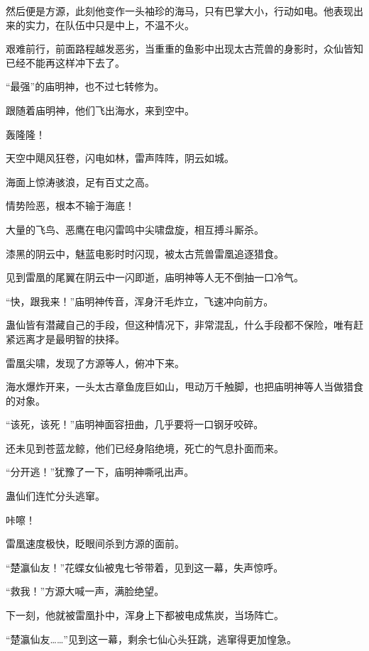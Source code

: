 \begin{this_body}
然后便是方源，此刻他变作一头袖珍的海马，只有巴掌大小，行动如电。他表现出来的实力，在队伍中只是中上，不温不火。

艰难前行，前面路程越发恶劣，当重重的鱼影中出现太古荒兽的身影时，众仙皆知已经不能再这样冲下去了。

“最强”的庙明神，也不过七转修为。

跟随着庙明神，他们飞出海水，来到空中。

轰隆隆！

天空中飓风狂卷，闪电如林，雷声阵阵，阴云如城。

海面上惊涛骇浪，足有百丈之高。

情势险恶，根本不输于海底！

大量的飞鸟、恶鹰在电闪雷鸣中尖啸盘旋，相互搏斗厮杀。

漆黑的阴云中，魅蓝电影时时闪现，被太古荒兽雷凰追逐猎食。

见到雷凰的尾翼在阴云中一闪即逝，庙明神等人无不倒抽一口冷气。

“快，跟我来！”庙明神传音，浑身汗毛炸立，飞速冲向前方。

蛊仙皆有潜藏自己的手段，但这种情况下，非常混乱，什么手段都不保险，唯有赶紧远离才是最明智的抉择。

雷凰尖啸，发现了方源等人，俯冲下来。

海水爆炸开来，一头太古章鱼庞巨如山，甩动万千触脚，也把庙明神等人当做猎食的对象。

“该死，该死！”庙明神面容扭曲，几乎要将一口钢牙咬碎。

还未见到苍蓝龙鲸，他们已经身陷绝境，死亡的气息扑面而来。

“分开逃！”犹豫了一下，庙明神嘶吼出声。

蛊仙们连忙分头逃窜。

咔嚓！

雷凰速度极快，眨眼间杀到方源的面前。

“楚瀛仙友！”花蝶女仙被鬼七爷带着，见到这一幕，失声惊呼。

“救我！”方源大喊一声，满脸绝望。

下一刻，他就被雷凰扑中，浑身上下都被电成焦炭，当场阵亡。

“楚瀛仙友……”见到这一幕，剩余七仙心头狂跳，逃窜得更加惶急。

\end{this_body}

